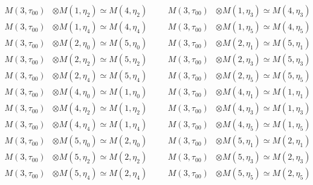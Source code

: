 \begin{align*}
M(3,\tau_{00}) &\otimes M(1,\eta_{2}) \simeq M(4,\eta_{2}) &&& M(3,\tau_{00}) &\otimes M(1,\eta_{3}) \simeq M(4,\eta_{3})\\
M(3,\tau_{00}) &\otimes M(1,\eta_{4}) \simeq M(4,\eta_{4}) &&& M(3,\tau_{00}) &\otimes M(1,\eta_{5}) \simeq M(4,\eta_{5})\\
M(3,\tau_{00}) &\otimes M(2,\eta_{0}) \simeq M(5,\eta_{0}) &&& M(3,\tau_{00}) &\otimes M(2,\eta_{1}) \simeq M(5,\eta_{1})\\
M(3,\tau_{00}) &\otimes M(2,\eta_{2}) \simeq M(5,\eta_{2}) &&& M(3,\tau_{00}) &\otimes M(2,\eta_{3}) \simeq M(5,\eta_{3})\\
M(3,\tau_{00}) &\otimes M(2,\eta_{4}) \simeq M(5,\eta_{4}) &&& M(3,\tau_{00}) &\otimes M(2,\eta_{5}) \simeq M(5,\eta_{5})\\
M(3,\tau_{00}) &\otimes M(4,\eta_{0}) \simeq M(1,\eta_{0}) &&& M(3,\tau_{00}) &\otimes M(4,\eta_{1}) \simeq M(1,\eta_{1})\\
M(3,\tau_{00}) &\otimes M(4,\eta_{2}) \simeq M(1,\eta_{2}) &&& M(3,\tau_{00}) &\otimes M(4,\eta_{3}) \simeq M(1,\eta_{3})\\
M(3,\tau_{00}) &\otimes M(4,\eta_{4}) \simeq M(1,\eta_{4}) &&& M(3,\tau_{00}) &\otimes M(4,\eta_{5}) \simeq M(1,\eta_{5})\\
M(3,\tau_{00}) &\otimes M(5,\eta_{0}) \simeq M(2,\eta_{0}) &&& M(3,\tau_{00}) &\otimes M(5,\eta_{1}) \simeq M(2,\eta_{1})\\
M(3,\tau_{00}) &\otimes M(5,\eta_{2}) \simeq M(2,\eta_{2}) &&& M(3,\tau_{00}) &\otimes M(5,\eta_{3}) \simeq M(2,\eta_{3})\\
M(3,\tau_{00}) &\otimes M(5,\eta_{4}) \simeq M(2,\eta_{4}) &&& M(3,\tau_{00}) &\otimes M(5,\eta_{5}) \simeq M(2,\eta_{5})\\
\end{align*}

